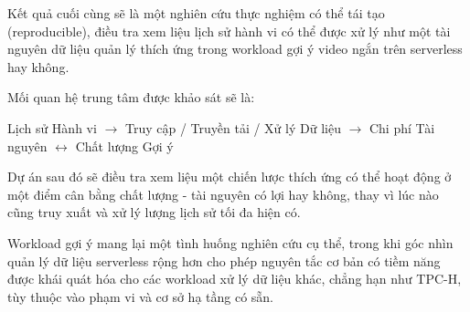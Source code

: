 \documentclass[12pt,a4paper]{article}
\begin{document}
Kết quả cuối cùng sẽ là một nghiên cứu thực nghiệm có thể tái tạo (reproducible), điều tra xem liệu lịch sử hành vi có thể được xử lý như một tài nguyên dữ liệu quản lý thích ứng trong workload gợi ý video ngắn trên serverless hay không.

Mối quan hệ trung tâm được khảo sát sẽ là:
\begin{center}
Lịch sử Hành vi $\rightarrow$ Truy cập / Truyền tải / Xử lý Dữ liệu $\rightarrow$ Chi phí Tài nguyên $\leftrightarrow$ Chất lượng Gợi ý
\end{center}

Dự án sau đó sẽ điều tra xem liệu một chiến lược thích ứng có thể hoạt động ở một điểm cân bằng chất lượng - tài nguyên có lợi hay không, thay vì lúc nào cũng truy xuất và xử lý lượng lịch sử tối đa hiện có.

Workload gợi ý mang lại một tình huống nghiên cứu cụ thể, trong khi góc nhìn quản lý dữ liệu serverless rộng hơn cho phép nguyên tắc cơ bản có tiềm năng được khái quát hóa cho các workload xử lý dữ liệu khác, chẳng hạn như TPC-H, tùy thuộc vào phạm vi và cơ sở hạ tầng có sẵn.
\end{document}
